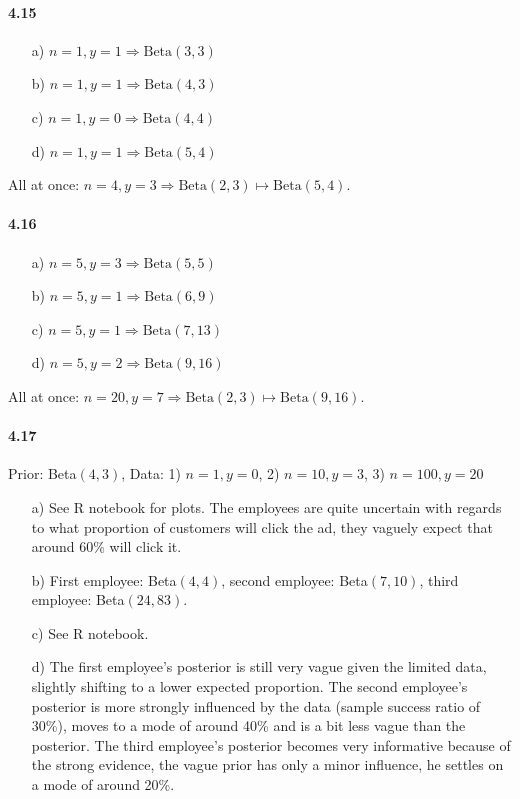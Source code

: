 \documentclass[fontsize=11pt,DIV=18,parskip=half]{scrartcl}
\begin{document}
\paragraph{4.15}
\begin{enumerate}
\item[a)] $n=1, y=1 \Rightarrow \text{Beta}(3,3)$
\item[b)] $n=1, y=1 \Rightarrow \text{Beta}(4,3)$
\item[c)] $n=1, y=0 \Rightarrow \text{Beta}(4,4)$
\item[d)] $n=1, y=1 \Rightarrow \text{Beta}(5,4)$
\end{enumerate}

All at once: $n=4, y=3 \Rightarrow \text{Beta}(2,3) \mapsto \text{Beta}(5,4)$.

\paragraph{4.16}
\begin{enumerate}
\item[a)] $n=5, y=3 \Rightarrow \text{Beta}(5,5)$
\item[b)] $n=5, y=1 \Rightarrow \text{Beta}(6,9)$
\item[c)] $n=5, y=1 \Rightarrow \text{Beta}(7,13)$
\item[d)] $n=5, y=2 \Rightarrow \text{Beta}(9,16)$
\end{enumerate}

All at once: $n=20, y=7 \Rightarrow \text{Beta}(2,3) \mapsto \text{Beta}(9,16)$.

\paragraph{4.17}
Prior: Beta$(4,3)$, Data: 1) $n=1, y=0$, 2) $n=10, y=3$, 3) $n=100, y=20$
\begin{enumerate}
\item[a)] See R notebook for plots. The employees are quite uncertain with regards to what proportion of customers will click the ad, they vaguely expect that around 60\% will click it.
\item[b)] First employee: Beta$(4,4)$, second employee: Beta$(7,10)$, third employee: Beta$(24,83)$.
\item[c)] See R notebook.
\item[d)] The first employee's posterior is still very vague given the limited data, slightly shifting to a lower expected proportion. The second employee's posterior is more strongly influenced by the data (sample success ratio of 30\%), moves to a mode of around 40\% and is a bit less vague than the posterior. The third employee's posterior becomes very informative because of the strong evidence, the vague prior has only a minor influence, he settles on a mode of around 20\%.
\end{enumerate}
\end{document}
